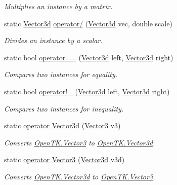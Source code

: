 \begin{DoxyCompactItemize}
\begin{DoxyCompactList}\small\item\em Multiplies an instance by a matrix. \end{DoxyCompactList}\item 
static \hyperlink{struct_open_t_k_1_1_vector3d}{Vector3d} \hyperlink{struct_open_t_k_1_1_vector3d_a207436ca4cb857eced58727aa513763f}{operator/} (\hyperlink{struct_open_t_k_1_1_vector3d}{Vector3d} vec, double scale)
\begin{DoxyCompactList}\small\item\em Divides an instance by a scalar. \end{DoxyCompactList}\item 
static bool \hyperlink{struct_open_t_k_1_1_vector3d_a26c18a277d3551a7bce1607a034b4b3b}{operator==} (\hyperlink{struct_open_t_k_1_1_vector3d}{Vector3d} left, \hyperlink{struct_open_t_k_1_1_vector3d}{Vector3d} right)
\begin{DoxyCompactList}\small\item\em Compares two instances for equality. \end{DoxyCompactList}\item 
static bool \hyperlink{struct_open_t_k_1_1_vector3d_ae24bedde1d9f1fcb4bbf5d647dcdea2a}{operator!=} (\hyperlink{struct_open_t_k_1_1_vector3d}{Vector3d} left, \hyperlink{struct_open_t_k_1_1_vector3d}{Vector3d} right)
\begin{DoxyCompactList}\small\item\em Compares two instances for inequality. \end{DoxyCompactList}\item 
static \hyperlink{struct_open_t_k_1_1_vector3d_a2e09d81252a6ec595b736f29c447f52f}{operator Vector3d} (\hyperlink{struct_open_t_k_1_1_vector3}{Vector3} v3)
\begin{DoxyCompactList}\small\item\em Converts \hyperlink{struct_open_t_k_1_1_vector3}{Open\-T\-K.\-Vector3} to \hyperlink{struct_open_t_k_1_1_vector3d}{Open\-T\-K.\-Vector3d}.\end{DoxyCompactList}\item 
static \hyperlink{struct_open_t_k_1_1_vector3d_aa29e45d1a757cdc73d8c91ea7b38f36d}{operator Vector3} (\hyperlink{struct_open_t_k_1_1_vector3d}{Vector3d} v3d)
\begin{DoxyCompactList}\small\item\em Converts \hyperlink{struct_open_t_k_1_1_vector3d}{Open\-T\-K.\-Vector3d} to \hyperlink{struct_open_t_k_1_1_vector3}{Open\-T\-K.\-Vector3}.\end{DoxyCompactList}\end{DoxyCompactItemize}
